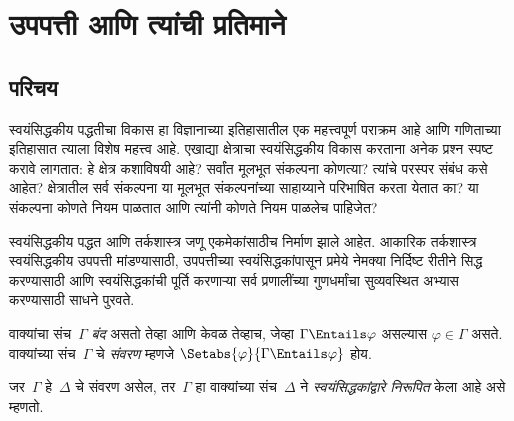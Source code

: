 \chapter{उपपत्ती आणि त्यांची प्रतिमाने}\label{fol:mat::chap}








\section{परिचय}\label{fol:mat:int:sec}

\begin{explain}
स्वयंसिद्धकीय पद्धतीचा विकास हा विज्ञानाच्या इतिहासातील एक महत्त्वपूर्ण
पराक्रम आहे आणि गणिताच्या इतिहासात त्याला विशेष महत्त्व आहे. एखाद्या
क्षेत्राचा स्वयंसिद्धकीय विकास करताना अनेक प्रश्न स्पष्ट करावे लागतात: हे
क्षेत्र कशाविषयी आहे? सर्वांत मूलभूत संकल्पना कोणत्या? त्यांचे परस्पर संबंध
कसे आहेत? क्षेत्रातील सर्व संकल्पना या मूलभूत संकल्पनांच्या साहाय्याने
परिभाषित करता येतात का? या संकल्पना कोणते नियम पाळतात आणि त्यांनी कोणते
नियम पाळलेच पाहिजेत?

स्वयंसिद्धकीय पद्धत आणि तर्कशास्त्र जणू एकमेकांसाठीच निर्माण झाले आहेत.
आकारिक तर्कशास्त्र स्वयंसिद्धकीय उपपत्ती मांडण्यासाठी, उपपत्तीच्या
स्वयंसिद्धकांपासून प्रमेये नेमक्या निर्दिष्ट रीतीने सिद्ध करण्यासाठी आणि
स्वयंसिद्धकांची पूर्ति करणाऱ्या सर्व प्रणालींच्या गुणधर्मांचा सुव्यवस्थित
अभ्यास करण्यासाठी साधने पुरवते.
\end{explain}

\begin{defn}
वाक्यांचा संच~$\Gamma$ \emph{बंद} असतो तेव्हा आणि केवळ तेव्हाच,
जेव्हा $\Gamma \Entails \varphi$ असल्यास $\varphi \in \Gamma$ असते.
वाक्यांच्या संच~$\Gamma$ चे \emph{संवरण} म्हणजे
$\Setabs{\varphi}{\Gamma \Entails \varphi}$ होय.

जर~$\Gamma$ हे~$\Delta$ चे संवरण असेल, तर~$\Gamma$ हा वाक्यांच्या
संच~$\Delta$ ने \emph{स्वयंसिद्धकांद्वारे निरूपित} केला आहे असे म्हणतो.
\end{defn}


